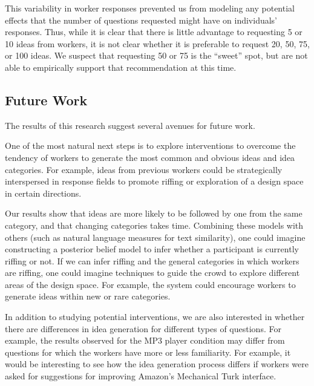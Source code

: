 This variability in worker responses prevented us from modeling any potential effects that the number of questions requested might have on individuals' responses. Thus, while it is clear that there is little advantage to requesting 5 or 10 ideas from workers, it is not clear whether it is preferable to request 20, 50, 75, or 100 ideas. We suspect that requesting 50 or 75 is the ``sweet'' spot, but are not able to empirically support that recommendation at this time.

\subsection{Future Work}
The results of this research suggest several avenues for future work.

One of the most natural next steps is to explore interventions to overcome the tendency of workers to generate the most common and obvious ideas and idea categories. For example, ideas from previous workers could be strategically interspersed in response fields to promote riffing or exploration of a design space in certain directions. 

Our results show that ideas are more likely to be followed by one from the same category, and that changing categories takes time. Combining these models with others (such as natural language measures for text similarity), one could imagine constructing a posterior belief model to infer whether a participant is currently riffing or not. If we can infer riffing and the general categories in which workers are riffing, one could imagine techniques to guide the crowd to explore different areas of the design space. For example, the system could encourage workers to generate ideas within new or rare categories.

In addition to studying potential interventions, we are also interested in whether there are differences in idea generation for different types of questions. For example, the results observed for the MP3 player condition may differ from questions for which the workers have more or less familiarity. For example, it would be interesting to see how the idea generation process differs if workers were asked for suggestions for improving Amazon's Mechanical Turk interface.





